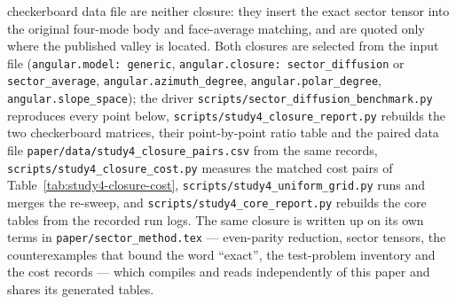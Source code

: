 \begin{sloppypar}
checkerboard data file are neither closure: they insert the exact sector tensor into
the original four-mode body and face-average matching, and are quoted only where the
published valley is located. Both closures are selected from the input file
(\texttt{angular.model: generic}, \texttt{angular.closure: sector\_diffusion} or
\texttt{sector\_average}, \texttt{angular.azimuth\_degree},
\texttt{angular.polar\_degree}, \texttt{angular.slope\_space}); the driver
\texttt{scripts/sector\_diffusion\_benchmark.py} reproduces every point
below, \texttt{scripts/study4\_closure\_report.py} rebuilds the two checkerboard
matrices, their point-by-point ratio table and the paired data file
\texttt{paper/data/study4\_closure\_pairs.csv} from the same records,
\texttt{scripts/study4\_closure\_cost.py} measures the matched cost pairs of
Table~\ref{tab:study4-closure-cost}, \texttt{scripts/study4\_uniform\_grid.py} runs
and merges the re-sweep, and \texttt{scripts/study4\_core\_report.py} rebuilds the
core tables from the recorded run logs. The same closure is written up on its own terms in
\texttt{paper/sector\_method.tex} --- even-parity reduction, sector tensors, the
counterexamples that bound the word ``exact'', the test-problem inventory and the
cost records --- which compiles and reads independently of this paper and shares its
generated tables.

\end{sloppypar}

